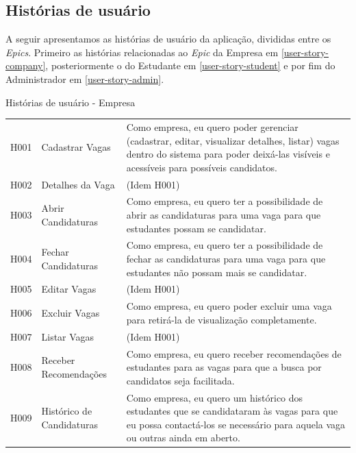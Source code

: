 \subsection{Histórias de usuário}

A seguir apresentamos as histórias de usuário da aplicação, divididas entre os \textit{Epics}. Primeiro as histórias relacionadas ao \textit{Epic} da Empresa em \autoref{user-story-company}, posteriormente o do Estudante em \autoref{user-story-student} e por fim do Administrador em \autoref{user-story-admin}.

\begin{quadro}[H]
	\centering
	\ABNTEXfontereduzida
	\caption{Histórias de usuário - Empresa}
	\label{user-story-company}
	\begin{tabular}{|l|l|p{9cm}|}
	\hline
		\thead{Código} & \thead{Nome} & \thead[l]{Descrição}\\
	\hline
	H001 & Cadastrar Vagas &
		Como empresa, eu quero poder gerenciar (cadastrar, editar, visualizar detalhes, listar) vagas dentro do sistema para poder deixá-las visíveis e acessíveis para possíveis candidatos.  \\
	\hline
	H002 & Detalhes da Vaga & (Idem H001) \\
	\hline
	H003 & Abrir Candidaturas & Como empresa, eu quero ter a possibilidade de abrir as candidaturas para uma vaga para que estudantes possam se candidatar. \\
	\hline
	H004 & Fechar Candidaturas & Como empresa, eu quero ter a possibilidade de fechar as candidaturas para uma vaga para que estudantes não possam mais se candidatar. \\
	\hline
	H005 & Editar Vagas & (Idem H001) \\
	\hline
	H006 & Excluir Vagas & Como empresa, eu quero poder excluir uma vaga para retirá-la de visualização completamente. \\
	\hline
	H007 & Listar Vagas & (Idem H001)\\
	\hline
	H008 & Receber Recomendações & Como empresa, eu quero receber recomendações de estudantes para as vagas para que a busca por candidatos seja facilitada. \\
	\hline
	H009 & Histórico de Candidaturas & Como empresa, eu quero um histórico dos estudantes que se candidataram às vagas para que eu possa contactá-los se necessário para aquela vaga ou outras ainda em aberto.  \\

\end{tabular}
\end{quadro}
